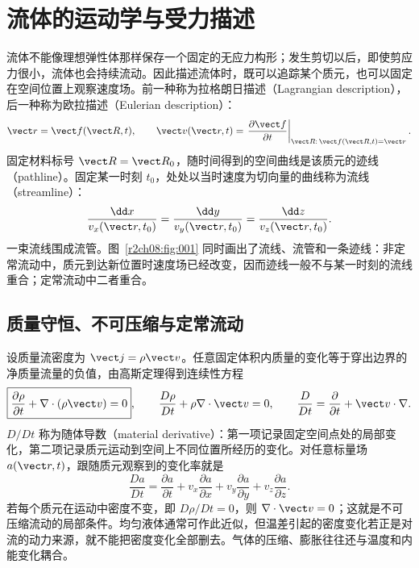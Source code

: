 \section{流体的运动学与受力描述}
\label{r2ch08:sec:description}

流体不能像理想弹性体那样保存一个固定的无应力构形；发生剪切以后，即使剪应力很小，流体也会持续流动。因此描述流体时，既可以追踪某个质元，也可以固定在空间位置上观察速度场。前一种称为拉格朗日描述（Lagrangian description），后一种称为欧拉描述（Eulerian description）：
\begin{equation}
 \vect r=\vect f(\vect R,t),\qquad
 \vect v(\vect r,t)=
 \left.\frac{\partial\vect f}{\partial t}\right|_{\vect R:\,\vect f(\vect R,t)=\vect r}.
 \label{r2ch08:eq:001}
\end{equation}
固定材料标号 $\vect R=\vect R_0$，随时间得到的空间曲线是该质元的迹线（pathline）。固定某一时刻 $t_0$，处处以当时速度为切向量的曲线称为流线（streamline）：
\begin{equation}
 \frac{\dd x}{v_x(\vect r,t_0)}=
 \frac{\dd y}{v_y(\vect r,t_0)}=
 \frac{\dd z}{v_z(\vect r,t_0)}.
 \label{r2ch08:eq:002}
\end{equation}
一束流线围成流管。图~\ref{r2ch08:fig:001} 同时画出了流线、流管和一条迹线：非定常流动中，质元到达新位置时速度场已经改变，因而迹线一般不与某一时刻的流线重合；定常流动中二者重合。
\figFlowKinematics

\subsection{质量守恒、不可压缩与定常流动}
\label{r2ch08:subsec:continuity}

设质量流密度为 $\vect j=\rho\vect v$。任意固定体积内质量的变化等于穿出边界的净质量流量的负值，由高斯定理得到连续性方程
\begin{equation}
 \boxed{\frac{\partial\rho}{\partial t}+\nabla\cdot(\rho\vect v)=0},
 \qquad
 \frac{D\rho}{Dt}+\rho\nabla\cdot\vect v=0,
 \qquad
 \frac D{Dt}=\frac\partial{\partial t}+\vect v\cdot\nabla.
 \label{r2ch08:eq:003}
\end{equation}
$D/Dt$ 称为随体导数（material derivative）：第一项记录固定空间点处的局部变化，第二项记录质元运动到空间上不同位置所经历的变化。对任意标量场 $a(\vect r,t)$，跟随质元观察到的变化率就是
\begin{equation}
 \frac{Da}{Dt}=\frac{\partial a}{\partial t}+v_x\frac{\partial a}{\partial x}
 +v_y\frac{\partial a}{\partial y}+v_z\frac{\partial a}{\partial z}.
 \label{r2ch08:eq:004}
\end{equation}
若每个质元在运动中密度不变，即 $D\rho/Dt=0$，则 $\nabla\cdot\vect v=0$；这就是不可压缩流动的局部条件。均匀液体通常可作此近似，但温差引起的密度变化若正是对流的动力来源，就不能把密度变化全部删去。气体的压缩、膨胀往往还与温度和内能变化耦合。

